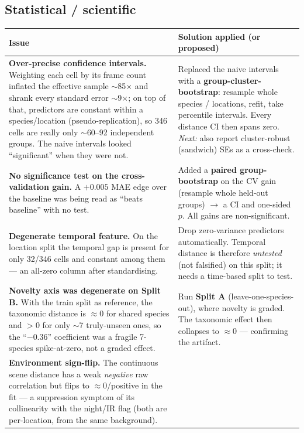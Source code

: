 \documentclass[11pt]{article}
\begin{document}
\subsection{Statistical / scientific}
\begin{table}[h]
\centering
\small
\begin{tabularx}{\textwidth}{p{4.3cm}Y}
\toprule
Issue & Solution applied (or proposed) \\
\midrule
\textbf{Over-precise confidence intervals.} Weighting each cell by its frame count
inflated the effective sample $\sim$85$\times$ and shrank every standard error $\sim$9$\times$; on top of
that, predictors are constant within a species/location (pseudo-replication), so 346 cells are really only
$\sim$60--92 independent groups. The naive intervals looked ``significant'' when they were not. &
Replaced the naive intervals with a \textbf{group-cluster-bootstrap}: resample whole species / locations,
refit, take percentile intervals. Every distance CI then spans zero. \emph{Next:} also report
cluster-robust (sandwich) SEs as a cross-check. \\
\addlinespace
\textbf{No significance test on the cross-validation gain.} A $+0.005$ MAE edge over the baseline was being
read as ``beats baseline'' with no test. &
Added a \textbf{paired group-bootstrap} on the CV gain (resample whole held-out groups) $\to$ a CI and
one-sided $p$. All gains are non-significant. \\
\addlinespace
\textbf{Degenerate temporal feature.} On the location split the temporal gap is present for only 32/346
cells and constant among them --- an all-zero column after standardising. &
Drop zero-variance predictors automatically. Temporal distance is therefore \emph{untested} (not falsified)
on this split; it needs a time-based split to test. \\
\addlinespace
\textbf{Novelty axis was degenerate on Split B.} With the train split as reference,
the taxonomic distance is $\approx 0$ for shared species and $>0$ for only $\sim$7 truly-unseen ones, so
the ``$-0.36$'' coefficient was a fragile 7-species spike-at-zero, not a graded effect. &
Run \textbf{Split A} (leave-one-species-out), where novelty is graded. The taxonomic effect then collapses
to $\approx 0$ --- confirming the artifact. \\
\addlinespace
\textbf{Environment sign-flip.} The continuous scene distance has a weak \emph{negative} raw correlation
but flips to $\approx 0$/positive in the fit --- a suppression symptom of its collinearity with the
night/IR flag (both are per-location, from the same background). &

\end{tabularx}
\end{table}
\end{document}

